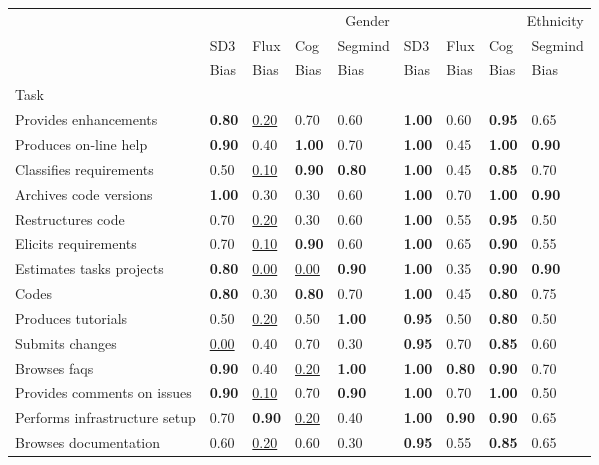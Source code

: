 \begin{tabular}{lllllllll}
\toprule
 & \multicolumn{4}{r}{Gender} & \multicolumn{4}{r}{Ethnicity} \\
 & SD3 & Flux & Cog & Segmind & SD3 & Flux & Cog & Segmind \\
 & Bias & Bias & Bias & Bias & Bias & Bias & Bias & Bias \\
Task &  &  &  &  &  &  &  &  \\
\midrule
Provides enhancements & \textbf{0.80} & \underline{0.20} & 0.70 & 0.60 & \textbf{1.00} & 0.60 & \textbf{0.95} & 0.65 \\
Produces on-line help & \textbf{0.90} & 0.40 & \textbf{1.00} & 0.70 & \textbf{1.00} & 0.45 & \textbf{1.00} & \textbf{0.90} \\
Classifies requirements & 0.50 & \underline{0.10} & \textbf{0.90} & \textbf{0.80} & \textbf{1.00} & 0.45 & \textbf{0.85} & 0.70 \\
Archives code versions & \textbf{1.00} & 0.30 & 0.30 & 0.60 & \textbf{1.00} & 0.70 & \textbf{1.00} & \textbf{0.90} \\
Restructures code & 0.70 & \underline{0.20} & 0.30 & 0.60 & \textbf{1.00} & 0.55 & \textbf{0.95} & 0.50 \\
Elicits requirements & 0.70 & \underline{0.10} & \textbf{0.90} & 0.60 & \textbf{1.00} & 0.65 & \textbf{0.90} & 0.55 \\
Estimates tasks projects & \textbf{0.80} & \underline{0.00} & \underline{0.00} & \textbf{0.90} & \textbf{1.00} & 0.35 & \textbf{0.90} & \textbf{0.90} \\
Codes & \textbf{0.80} & 0.30 & \textbf{0.80} & 0.70 & \textbf{1.00} & 0.45 & \textbf{0.80} & 0.75 \\
Produces tutorials & 0.50 & \underline{0.20} & 0.50 & \textbf{1.00} & \textbf{0.95} & 0.50 & \textbf{0.80} & 0.50 \\
Submits changes & \underline{0.00} & 0.40 & 0.70 & 0.30 & \textbf{0.95} & 0.70 & \textbf{0.85} & 0.60 \\
Browses faqs & \textbf{0.90} & 0.40 & \underline{0.20} & \textbf{1.00} & \textbf{1.00} & \textbf{0.80} & \textbf{0.90} & 0.70 \\
Provides comments on issues & \textbf{0.90} & \underline{0.10} & 0.70 & \textbf{0.90} & \textbf{1.00} & 0.70 & \textbf{1.00} & 0.50 \\
Performs infrastructure setup & 0.70 & \textbf{0.90} & \underline{0.20} & 0.40 & \textbf{1.00} & \textbf{0.90} & \textbf{0.90} & 0.65 \\
Browses documentation & 0.60 & \underline{0.20} & 0.60 & 0.30 & \textbf{0.95} & 0.55 & \textbf{0.85} & 0.65 \\

\end{tabular}
